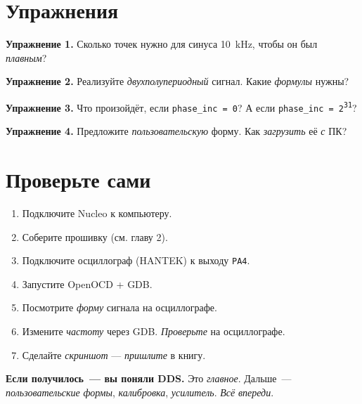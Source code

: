 \section{Упражнения}
\label{sec:dds-exercises}

\begin{exercisebox}
\textbf{Упражнение 1.} Сколько точек нужно для синуса
\SI{10}{\kilo\hertz}, чтобы он был \emph{плавным}?
\end{exercisebox}

\begin{exercisebox}
\textbf{Упражнение 2.} Реализуйте \emph{двухполупериодный}
сигнал. Какие \emph{формулы} нужны?
\end{exercisebox}

\begin{exercisebox}
\textbf{Упражнение 3.} Что произойдёт, если
\texttt{phase\_inc = 0}? А если \texttt{phase\_inc = 2\textsuperscript{31}}?
\end{exercisebox}

\begin{exercisebox}
\textbf{Упражнение 4.} Предложите \emph{пользовательскую}
форму. Как \emph{загрузить} её \emph{с} ПК?
\end{exercisebox}

\section{Проверьте сами}
\label{sec:dds-check}

\begin{enumerate}
    \item Подключите Nucleo к компьютеру.
    \item Соберите прошивку (см. главу 2).
    \item Подключите осциллограф (HANTEK) к выходу \texttt{PA4}.
    \item Запустите OpenOCD + GDB.
    \item Посмотрите \emph{форму} сигнала на осциллографе.
    \item Измените \emph{частоту} через GDB. \emph{Проверьте}
          на осциллографе.
    \item Сделайте \emph{скриншот} — \emph{пришлите} в книгу.
\end{enumerate}

\begin{ideabox}
\textbf{Если получилось~--- вы поняли DDS.} Это
\emph{главное}. Дальше~--- \emph{пользовательские}
\emph{формы}, \emph{калибровка}, \emph{усилитель}.
\emph{Всё} \emph{впереди}.
\end{ideabox}


